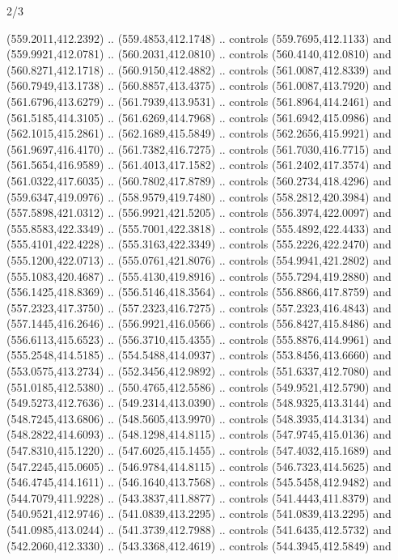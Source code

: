 \begin{flagdescription}{2/3}
\begin{scope}[xshift=0.5\flaglength,yshift=0.5\flagwidth,scale=\flagwidth/495.65]
\begin{scope}[y=0.8pt, x=0.8pt, yscale=-1,shift={(-463.76,-309.78)}]
  (559.2011,412.2392) .. (559.4853,412.1748) .. controls (559.7695,412.1133) and
  (559.9921,412.0781) .. (560.2031,412.0810) .. controls (560.4140,412.0810) and
  (560.8271,412.1718) .. (560.9150,412.4882) .. controls (561.0087,412.8339) and
  (560.7949,413.1738) .. (560.8857,413.4375) .. controls (561.0087,413.7920) and
  (561.6796,413.6279) .. (561.7939,413.9531) .. controls (561.8964,414.2461) and
  (561.5185,414.3105) .. (561.6269,414.7968) .. controls (561.6942,415.0986) and
  (562.1015,415.2861) .. (562.1689,415.5849) .. controls (562.2656,415.9921) and
  (561.9697,416.4170) .. (561.7382,416.7275) .. controls (561.7030,416.7715) and
  (561.5654,416.9589) .. (561.4013,417.1582) .. controls (561.2402,417.3574) and
  (561.0322,417.6035) .. (560.7802,417.8789) .. controls (560.2734,418.4296) and
  (559.6347,419.0976) .. (558.9579,419.7480) .. controls (558.2812,420.3984) and
  (557.5898,421.0312) .. (556.9921,421.5205) .. controls (556.3974,422.0097) and
  (555.8583,422.3349) .. (555.7001,422.3818) .. controls (555.4892,422.4433) and
  (555.4101,422.4228) .. (555.3163,422.3349) .. controls (555.2226,422.2470) and
  (555.1200,422.0713) .. (555.0761,421.8076) .. controls (554.9941,421.2802) and
  (555.1083,420.4687) .. (555.4130,419.8916) .. controls (555.7294,419.2880) and
  (556.1425,418.8369) .. (556.5146,418.3564) .. controls (556.8866,417.8759) and
  (557.2323,417.3750) .. (557.2323,416.7275) .. controls (557.2323,416.4843) and
  (557.1445,416.2646) .. (556.9921,416.0566) .. controls (556.8427,415.8486) and
  (556.6113,415.6523) .. (556.3710,415.4355) .. controls (555.8876,414.9961) and
  (555.2548,414.5185) .. (554.5488,414.0937) .. controls (553.8456,413.6660) and
  (553.0575,413.2734) .. (552.3456,412.9892) .. controls (551.6337,412.7080) and
  (551.0185,412.5380) .. (550.4765,412.5586) .. controls (549.9521,412.5790) and
  (549.5273,412.7636) .. (549.2314,413.0390) .. controls (548.9325,413.3144) and
  (548.7245,413.6806) .. (548.5605,413.9970) .. controls (548.3935,414.3134) and
  (548.2822,414.6093) .. (548.1298,414.8115) .. controls (547.9745,415.0136) and
  (547.8310,415.1220) .. (547.6025,415.1455) .. controls (547.4032,415.1689) and
  (547.2245,415.0605) .. (546.9784,414.8115) .. controls (546.7323,414.5625) and
  (546.4745,414.1611) .. (546.1640,413.7568) .. controls (545.5458,412.9482) and
  (544.7079,411.9228) .. (543.3837,411.8877) .. controls (541.4443,411.8379) and
  (540.9521,412.9746) .. (541.0839,413.2295) .. controls (541.0839,413.2295) and
  (541.0985,413.0244) .. (541.3739,412.7988) .. controls (541.6435,412.5732) and
  (542.2060,412.3330) .. (543.3368,412.4619) .. controls (544.3945,412.5849) and

\end{scope}
\end{scope}
\end{flagdescription}
